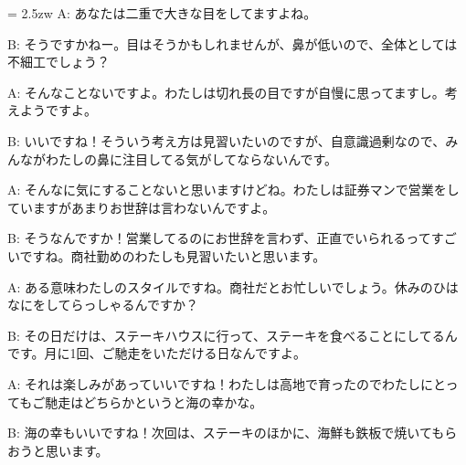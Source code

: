 \documentclass[11pt]{amsart}
\title{}
\author{}
\newenvironment{hangall}[1]{\hangindent = 2.5zw\everypar{\hangindent = 2.5zw}}{}
\begin{document}
\maketitle
\begin{hangall}{}%
A: あなたは二重で大きな目をしてますよね。



B: そうですかねー。目はそうかもしれませんが、鼻が低いので、全体としては不細工でしょう？



A: そんなことないですよ。わたしは切れ長の目ですが自慢に思ってますし。考えようですよ。



B: いいですね！そういう考え方は見習いたいのですが、自意識過剰なので、みんながわたしの鼻に注目してる気がしてならないんです。



A: そんなに気にすることないと思いますけどね。わたしは証券マンで営業をしていますがあまりお世辞は言わないんですよ。



B: そうなんですか！営業してるのにお世辞を言わず、正直でいられるってすごいですね。商社勤めのわたしも見習いたいと思います。



A: ある意味わたしのスタイルですね。商社だとお忙しいでしょう。休みのひはなにをしてらっしゃるんですか？



B: その日だけは、ステーキハウスに行って、ステーキを食べることにしてるんです。月に1回、ご馳走をいただける日なんですよ。



A: それは楽しみがあっていいですね！わたしは高地で育ったのでわたしにとってもご馳走はどちらかというと海の幸かな。



B: 海の幸もいいですね！次回は、ステーキのほかに、海鮮も鉄板で焼いてもらおうと思います。\end{hangall}
\end{document}
